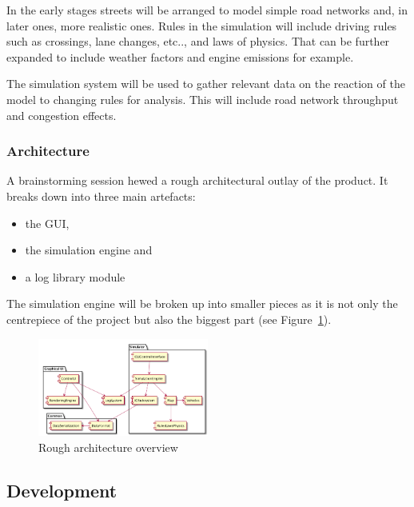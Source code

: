 \vspace{3mm}

In the early stages streets will be arranged to model simple road networks and, in later ones, more realistic ones.
Rules in the simulation will include driving rules such as crossings, lane changes, etc.., and laws of physics. That can be further expanded to include weather factors and engine emissions for example.

\vspace{3mm}

The simulation system will be used to gather relevant data on the reaction of the model to changing rules for analysis. This will include road network throughput and congestion effects.

\subsubsection{Architecture}

A brainstorming session hewed a rough architectural outlay of the product. It breaks down into three main artefacts:
\vspace{1mm}
\begin{itemize}
	\item the GUI,
	\item the simulation engine and
	\item a log library module
\end{itemize}
\vspace{1mm}
The simulation engine will be broken up into smaller pieces as it is not only the centrepiece of the project but also the biggest part (see Figure~\ref{fig:arch_overview}).

\begin{figure}[h!]
	\vspace{1.5em}
  	\caption{Rough architecture overview}
  	\label{fig:arch_overview}
  	\centering
	\includegraphics[width=0.5\textwidth]{figs/arch_diagram.png}
  	\vspace{1.5em}
\end{figure}

\subsection{Development}

